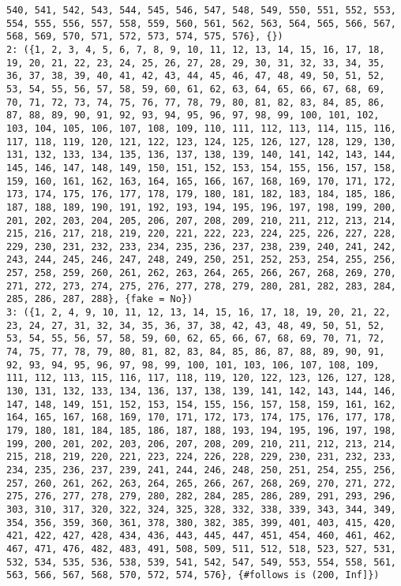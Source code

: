 \documentclass[
  letterpaper,
  DIV=11,
  numbers=noendperiod]{scrreprt}
\begin{document}
\begin{verbatim}
540, 541, 542, 543, 544, 545, 546, 547, 548, 549, 550, 551, 552, 553, 554, 555, 556, 557, 558, 559, 560, 561, 562, 563, 564, 565, 566, 567, 568, 569, 570, 571, 572, 573, 574, 575, 576}, {})
2: ({1, 2, 3, 4, 5, 6, 7, 8, 9, 10, 11, 12, 13, 14, 15, 16, 17, 18, 19, 20, 21, 22, 23, 24, 25, 26, 27, 28, 29, 30, 31, 32, 33, 34, 35, 36, 37, 38, 39, 40, 41, 42, 43, 44, 45, 46, 47, 48, 49, 50, 51, 52, 53, 54, 55, 56, 57, 58, 59, 60, 61, 62, 63, 64, 65, 66, 67, 68, 69, 70, 71, 72, 73, 74, 75, 76, 77, 78, 79, 80, 81, 82, 83, 84, 85, 86, 87, 88, 89, 90, 91, 92, 93, 94, 95, 96, 97, 98, 99, 100, 101, 102, 103, 104, 105, 106, 107, 108, 109, 110, 111, 112, 113, 114, 115, 116, 117, 118, 119, 120, 121, 122, 123, 124, 125, 126, 127, 128, 129, 130, 131, 132, 133, 134, 135, 136, 137, 138, 139, 140, 141, 142, 143, 144, 145, 146, 147, 148, 149, 150, 151, 152, 153, 154, 155, 156, 157, 158, 159, 160, 161, 162, 163, 164, 165, 166, 167, 168, 169, 170, 171, 172, 173, 174, 175, 176, 177, 178, 179, 180, 181, 182, 183, 184, 185, 186, 187, 188, 189, 190, 191, 192, 193, 194, 195, 196, 197, 198, 199, 200, 201, 202, 203, 204, 205, 206, 207, 208, 209, 210, 211, 212, 213, 214, 215, 216, 217, 218, 219, 220, 221, 222, 223, 224, 225, 226, 227, 228, 229, 230, 231, 232, 233, 234, 235, 236, 237, 238, 239, 240, 241, 242, 243, 244, 245, 246, 247, 248, 249, 250, 251, 252, 253, 254, 255, 256, 257, 258, 259, 260, 261, 262, 263, 264, 265, 266, 267, 268, 269, 270, 271, 272, 273, 274, 275, 276, 277, 278, 279, 280, 281, 282, 283, 284, 285, 286, 287, 288}, {fake = No})
3: ({1, 2, 4, 9, 10, 11, 12, 13, 14, 15, 16, 17, 18, 19, 20, 21, 22, 23, 24, 27, 31, 32, 34, 35, 36, 37, 38, 42, 43, 48, 49, 50, 51, 52, 53, 54, 55, 56, 57, 58, 59, 60, 62, 65, 66, 67, 68, 69, 70, 71, 72, 74, 75, 77, 78, 79, 80, 81, 82, 83, 84, 85, 86, 87, 88, 89, 90, 91, 92, 93, 94, 95, 96, 97, 98, 99, 100, 101, 103, 106, 107, 108, 109, 111, 112, 113, 115, 116, 117, 118, 119, 120, 122, 123, 126, 127, 128, 130, 131, 132, 133, 134, 136, 137, 138, 139, 141, 142, 143, 144, 146, 147, 148, 149, 151, 152, 153, 154, 155, 156, 157, 158, 159, 161, 162, 164, 165, 167, 168, 169, 170, 171, 172, 173, 174, 175, 176, 177, 178, 179, 180, 181, 184, 185, 186, 187, 188, 193, 194, 195, 196, 197, 198, 199, 200, 201, 202, 203, 206, 207, 208, 209, 210, 211, 212, 213, 214, 215, 218, 219, 220, 221, 223, 224, 226, 228, 229, 230, 231, 232, 233, 234, 235, 236, 237, 239, 241, 244, 246, 248, 250, 251, 254, 255, 256, 257, 260, 261, 262, 263, 264, 265, 266, 267, 268, 269, 270, 271, 272, 275, 276, 277, 278, 279, 280, 282, 284, 285, 286, 289, 291, 293, 296, 303, 310, 317, 320, 322, 324, 325, 328, 332, 338, 339, 343, 344, 349, 354, 356, 359, 360, 361, 378, 380, 382, 385, 399, 401, 403, 415, 420, 421, 422, 427, 428, 434, 436, 443, 445, 447, 451, 454, 460, 461, 462, 467, 471, 476, 482, 483, 491, 508, 509, 511, 512, 518, 523, 527, 531, 532, 534, 535, 536, 538, 539, 541, 542, 547, 549, 553, 554, 558, 561, 563, 566, 567, 568, 570, 572, 574, 576}, {#follows is (200, Inf]})

\end{verbatim}
\end{document}
